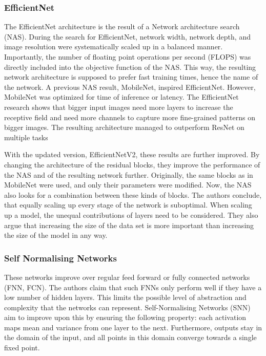 \subsubsection{EfficientNet}

The EfficientNet architecture is the result of a Network architecture search (NAS). 
During the search for EfficientNet, network width, network depth, and image resolution were systematically scaled up in a balanced manner. Importantly, the number of floating point operations per second (FLOPS) was directly included into the objective function of the NAS. \cite{Tan2019EfficientNet} This way, the resulting network architecture is supposed to prefer fast training times, hence the name of the network. A previous NAS result, MobileNet, inspired EfficientNet. However, MobileNet was optimized for time of inference or latency. \cite{Howard2017MobileNets, Sandler2018MobileNetV2}
The EfficientNet research shows that bigger input images need more layers to increase the receptive field and need more channels to capture more fine-grained patterns on bigger images. The resulting architecture managed to outperform ResNet on multiple tasks

With the updated version, EfficientNetV2, these results are further improved. By changing the architecture of the residual blocks, they improve the performance of the NAS and of the resulting network further. Originally, the same blocks as in MobileNet were used, and only their parameters were modified. Now, the NAS also looks for a combination between these kinds of blocks.
The authors conclude, that equally scaling up every stage of the network is suboptimal. When scaling up a model, the unequal contributions of layers need to be considered. 
They also argue that increasing the size of the data set is more important than increasing the size of the model in any way. \cite{Tan2021EfficientNetV2} 

\subsubsection{Self Normalising Networks}

These networks improve over regular feed forward or fully connected networks (FNN, FCN). The authors claim that such 
FNNs only perform well if they have a low number of hidden layers. \cite{Klambauer2017Self} This limits the possible level of abstraction and complexity that the networks can represent.
Self-Normalising Networks (SNN) aim to improve upon this by ensuring the following property: each activation maps mean and variance from one layer to the next. Furthermore, outputs stay in the domain of the input, and all points in this domain converge towards a single fixed point. 

